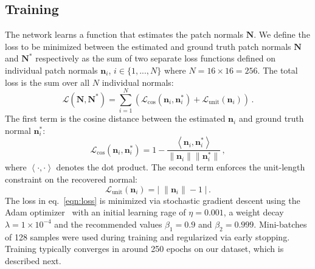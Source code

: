 \subsection{Training}

The network learns a function that estimates the patch normals $\mathbf{N}$. We define the loss to be minimized between the estimated and ground truth patch normals $\mathbf{N}$ and $\mathbf{N}^*$ respectively as the sum of two separate loss functions defined on individual patch normals $\mathbf{n}_i$, $i \in \{1, ..., N\}$ where $N = 16 \times 16 = 256$. The total loss is the sum over all $N$ individual normals: 
%
\begin{equation}
\mathcal{L}(\mathbf{N}, \mathbf{N}^*) = \sum_{i=1}^{N} \left(\mathcal{L}_{\cos}(\mathbf{n}_i, \mathbf{n}^*_i) + \mathcal{L}_{\mathrm{unit}}(\mathbf{n}_i) \right)\,.
\label{eqn:loss}
\end{equation}
%
The first term is the cosine distance between the estimated $\mathbf{n}_i$ and ground truth normal $\mathbf{n}^*_i$:
%
\begin{equation}
\mathcal{L}_{\cos}(\mathbf{n}_i, \mathbf{n}^*_i) = 1 - \frac{ \left\langle \mathbf{n}_i , \mathbf{n}^*_i \right\rangle }{ \lVert \mathbf{n}_i \rVert \lVert \mathbf{n}^*_i \rVert } \,,
\end{equation}
%
where $\left\langle \cdot , \cdot \right\rangle$ denotes the dot product. The second term enforces the unit-length constraint on the recovered normal: 
%
\begin{equation}
\mathcal{L}_{\mathrm{unit}}(\mathbf{n}_i) = \left| \; \lVert \mathbf{n}_i \rVert - 1 \; \right| \,.
\end{equation}
%
The loss in eq.~\eqref{eqn:loss} is minimized via stochastic gradient descent using the Adam optimizer~\cite{kingma-iclr-15} with an initial learning rage of $\eta = 0.001$, a weight decay $\lambda = 1\times10^{-4}$ and the recommended values $\beta_1 = 0.9$ and $\beta_2 = 0.999$. Mini-batches of 128 samples were used during training and regularized via early stopping. Training typically converges in around 250 epochs on our dataset, which is described next.





